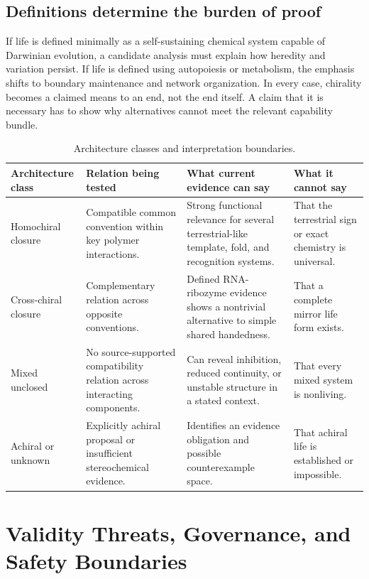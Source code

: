 \documentclass[conference]{IEEEtran}
\begin{document}
\subsection{Definitions determine the burden of proof}

If life is defined minimally as a self-sustaining chemical system capable of Darwinian evolution, a candidate analysis must explain how heredity and variation persist. If life is defined using autopoiesis or metabolism, the emphasis shifts to boundary maintenance and network organization. In every case, chirality becomes a claimed means to an end, not the end itself. A claim that it is necessary has to show why alternatives cannot meet the relevant capability bundle.

\begin{table}[!t]
\caption{Architecture classes and interpretation boundaries.}
\label{tab:architectures}
\centering
\renewcommand{\arraystretch}{1.17}
\begin{tabular}{|P{0.19\textwidth}|P{0.22\textwidth}|P{0.28\textwidth}|P{0.20\textwidth}|}
\hline
\textbf{Architecture class} & \textbf{Relation being tested} & \textbf{What current evidence can say} & \textbf{What it cannot say} \\
\hline
Homochiral closure & Compatible common convention within key polymer interactions. & Strong functional relevance for several terrestrial-like template, fold, and recognition systems. & That the terrestrial sign or exact chemistry is universal. \\
\hline
Cross-chiral closure & Complementary relation across opposite conventions. & Defined RNA-ribozyme evidence shows a nontrivial alternative to simple shared handedness. & That a complete mirror life form exists. \\
\hline
Mixed unclosed & No source-supported compatibility relation across interacting components. & Can reveal inhibition, reduced continuity, or unstable structure in a stated context. & That every mixed system is nonliving. \\
\hline
Achiral or unknown & Explicitly achiral proposal or insufficient stereochemical evidence. & Identifies an evidence obligation and possible counterexample space. & That achiral life is established or impossible. \\
\hline
\end{tabular}
\end{table}

\section{Validity Threats, Governance, and Safety Boundaries}
\end{document}
